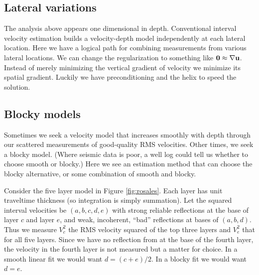 \begin{comment}
\moddex{vrms2int}{Converting RMS to interval velocity}
\end{comment}

\subsection{Lateral variations}
The analysis above appears one dimensional in depth.
Conventional interval velocity estimation builds a velocity-depth model
independently at each lateral location.
Here we have a logical path for combining measurements
from various lateral locations.
We can change the regularization
to something like $\bold 0\approx \nabla\bold u$.
Instead of merely minimizing the vertical gradient of velocity
we minimize its spatial gradient.
Luckily we have preconditioning and the helix to speed the solution.
\par

\subsection{Blocky models}

Sometimes we seek a velocity model that increases smoothly
with depth through our scattered
measurements of good-quality RMS velocities.
Other times, we seek a blocky model.
(Where seismic data is poor,
a well log could tell us whether to choose smooth or blocky.)
Here we see an estimation method that can choose the blocky alternative,
or some combination of smooth and blocky.

\par
Consider the five layer model in Figure \ref{fig:rosales}.
Each layer has unit traveltime thickness
(so integration is simply summation).
Let the squared interval velocities be $(a,b,c,d,e)$
with strong reliable reflections at the base of layer $c$ and layer $e$,
and weak, incoherent, ``bad'' reflections at bases of $(a,b,d)$.
Thus we measure $V_c^2$ the RMS velocity squared of the top three layers
and $V_e^2$ that for all five layers.
Since we have no reflection from at the base of the fourth layer,
the velocity in the fourth layer is not measured but a matter for choice.
In a smooth linear fit we would want $d=(c+e)/2$.
In a blocky fit we would want $d=e$.



